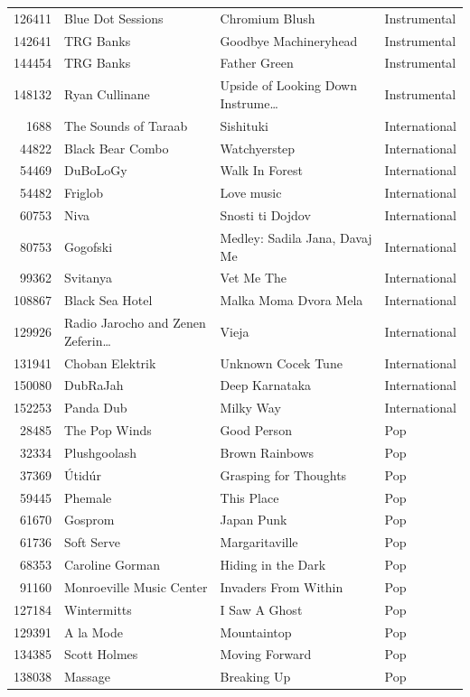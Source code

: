 \begin{footnotesize}
\begin{longtable}{@{}rlll@{}}
126411 & Blue Dot Sessions & Chromium Blush & Instrumental \\
142641 & TRG Banks & Goodbye Machineryhead & Instrumental \\
144454 & TRG Banks & Father Green & Instrumental \\
148132 & Ryan Cullinane & Upside of Looking Down Instrume\ldots & Instrumental \\
1688 & The Sounds of Taraab & Sishituki & International \\
44822 & Black Bear Combo & Watchyerstep & International \\
54469 & DuBoLoGy & Walk In Forest & International \\
54482 & Friglob & Love music & International \\
60753 & Niva & Snosti ti Dojdov & International \\
80753 & Gogofski & Medley: Sadila Jana, Davaj Me & International \\
99362 & Svitanya & Vet Me The & International \\
108867 & Black Sea Hotel & Malka Moma Dvora Mela & International \\
129926 & Radio Jarocho and Zenen Zeferin\ldots & Vieja & International \\
131941 & Choban Elektrik & Unknown Cocek Tune & International \\
150080 & DubRaJah & Deep Karnataka & International \\
152253 & Panda Dub & Milky Way & International \\
28485 & The Pop Winds & Good Person & Pop \\
32334 & Plushgoolash & Brown Rainbows & Pop \\
37369 & Útidúr & Grasping for Thoughts & Pop \\
59445 & Phemale & This Place & Pop \\
61670 & Gosprom & Japan Punk & Pop \\
61736 & Soft Serve & Margaritaville & Pop \\
68353 & Caroline Gorman & Hiding in the Dark & Pop \\
91160 & Monroeville Music Center & Invaders From Within & Pop \\
127184 & Wintermitts & I Saw A Ghost & Pop \\
129391 & A la Mode & Mountaintop & Pop \\
134385 & Scott Holmes & Moving Forward & Pop \\
138038 & Massage & Breaking Up & Pop \\

\end{longtable}
\end{footnotesize}
